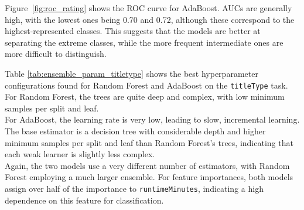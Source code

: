 Figure~\ref{fig:roc_rating} shows the ROC curve for AdaBoost.
AUCs are generally high, with the lowest ones being 0.70 and 0.72,
although these correspond to the highest-represented classes.
This suggests that the models are better at separating the
extreme classes, while the more frequent
intermediate ones are more difficult to distinguish.




\begin{table}[H]
    \centering
    \begin{minipage}{0.55\textwidth}
        Table \ref{tab:ensemble_param_titletype} shows the best hyperparameter
        configurations found for Random Forest and AdaBoost on the
        \texttt{titleType} task.\\

        For Random Forest, the trees are quite deep and complex,
        with low minimum samples per split and leaf.\\

        For AdaBoost, the learning rate is very low, leading to
        slow, incremental learning.
        The base estimator is a decision tree with
        considerable depth and higher minimum samples per split and
        leaf than Random Forest's trees, indicating that each weak
        learner is slightly less complex.\\

        Again, the two models use a very different number of
        estimators, with Random Forest employing a much larger
        ensemble. For feature importances, both models assign
        over half of the importance to \texttt{runtimeMinutes},
        indicating a high dependence on this feature for
        classification.


\end{minipage}
\end{table}
